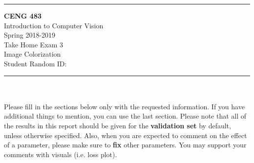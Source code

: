 \documentclass[12pt]{article}
\newcommand{\HRule}{\rule{\linewidth}{1mm}}
\begin{document}
\noindent
\HRule %
\small
\begin{center}
	\LARGE \textbf{CENG 483} \\[4mm]
	\Large Introduction to Computer Vision \\[4mm]
	\normalsize Spring 2018-2019 \\
	\Large Take Home Exam 3 \\
	\Large Image Colorization \\
    \Large Student Random ID: \\
\end{center}
\HRule

\begin{center}
\end{center}
\vspace{-10mm}
\noindent\\ \\ 
Please fill in the sections below only with the requested information. If you have additional things to mention, you can use the last section. Please note that all of the results in this report should be given for the \textbf{validation set} by default, unless otherwise specified. Also, when you are expected to comment on the effect of a parameter, please make sure to \textbf{fix} other parameters. You may support your comments with visuals (i.e. loss plot).
\end{document}

